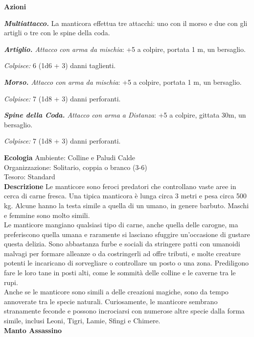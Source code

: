 \begin{multicols}{2}
\textbf{Azioni}

\emph{\textbf{Multiattacco.}} La manticora effettua tre attacchi: uno con il morso e due con gli artigli o tre con le spine della coda.

\emph{\textbf{Artiglio.} Attacco con arma da mischia}: +5 a colpire, portata 1 m, un bersaglio.

\emph{Colpisce:} 6 (1d6 + 3) danni taglienti.

\emph{\textbf{Morso.} Attacco con arma da mischia}: +5 a colpire, portata 1 m, un bersaglio.

\emph{Colpisce:} 7 (1d8 + 3) danni perforanti.

\emph{\textbf{Spine della Coda.} Attacco con arma a Distanza}: +5 a colpire, gittata 30m, un bersaglio.

\emph{Colpisce:} 7 (1d8 + 3) danni perforanti.

\textbf{Ecologia}
Ambiente: Colline e Paludi Calde\\
Organizzazione: Solitario, coppia o branco (3-6)\\
Tesoro: Standard\\

\textbf{Descrizione}
Le manticore sono feroci predatori che controllano vaste aree in cerca di carne fresca. Una tipica manticora è lunga circa 3 metri e pesa circa 500 kg. Alcune hanno la testa simile a quella di un umano, in genere barbuto. Maschi e femmine sono molto simili.\\

Le manticore mangiano qualsiasi tipo di carne, anche quella delle carogne, ma preferiscono quella umana e raramente si lasciano sfuggire un'occasione di gustare questa delizia. Sono abbastanza furbe e sociali da stringere patti con umanoidi malvagi per formare alleanze o da costringerli ad offre tributi, e molte creature potenti le incaricano di sorvegliare o controllare un posto o una zona. Prediligono fare le loro tane in posti alti, come le sommità delle colline e le caverne tra le rupi.\\

Anche se le manticore sono simili a delle creazioni magiche, sono da tempo annoverate tra le specie naturali. Curiosamente, le manticore sembrano stranamente feconde e possono incrociarsi con numerose altre specie dalla forma simile, inclusi Leoni, Tigri, Lamie, Sfingi e Chimere.\\


\medskip{}\textbf{Manto Assassino}


\end{multicols}
